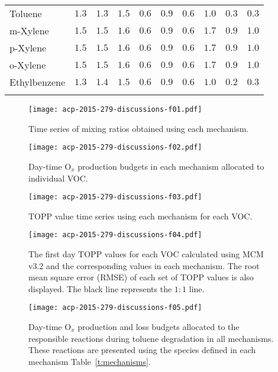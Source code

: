 \documentclass[acpd, online, hvmath]{copernicus}
\begin{document}
\begin{table}
{\begin{tabular}{llllllllll}
      Toluene &$1.3$ &$1.3$ &$1.5$ &$0.6$ &$0.9$ &$0.6$ &$1.0$ &$0.3$ &$0.3$ \\
      m-Xylene &$1.5$ &$1.5$ &$1.6$ &$0.6$ &$0.9$ &$0.6$ &$1.7$ &$0.9$ &$1.0$ \\
      p-Xylene &$1.5$ &$1.5$ &$1.6$ &$0.6$ &$0.9$ &$0.6$ &$1.7$ &$0.9$ &$1.0$ \\
      o-Xylene &$1.5$ &$1.5$ &$1.6$ &$0.6$ &$0.9$ &$0.6$ &$1.7$ &$0.9$ &$1.0$ \\
      Ethylbenzene &$1.3$ &$1.4$ &$1.5$ &$0.6$ &$0.9$ &$0.6$ &$1.0$ &$0.2$ &$0.3$ \\
      \bottomhline
    \end{tabular}}
    \label{t:cumulative_TOPPs_per_C}
\end{table}



\begin{figure}[t]
    \texttt{[image: acp-2015-279-discussions-f01.pdf]}
    \caption{Time series of  mixing ratios obtained using
      each mechanism.}
    \label{f:time_series}
\end{figure}
\begin{figure}
    \texttt{[image: acp-2015-279-discussions-f02.pdf]}
    \caption{Day-time O$_{x}$ production budgets in each mechanism
      allocated to individual VOC.}
    \label{f:Ox_tagged_budgets}
\end{figure}
\begin{figure}[t]
  \texttt{[image: acp-2015-279-discussions-f03.pdf]}
  \caption{TOPP value time series using each mechanism for each VOC.}
  \label{f:TOPP_dailies}
\end{figure}
\begin{figure}[t]
  \texttt{[image: acp-2015-279-discussions-f04.pdf]}
  \caption{The first day TOPP values for each VOC calculated using MCM
    v3.2 and the corresponding values in each mechanism. The root mean
    square error (RMSE) of each set of TOPP values is also
    displayed. The black line represents the $1:1$ line.}
    \label{f:first_day}
\end{figure}
\begin{figure}[t]
    \texttt{[image: acp-2015-279-discussions-f05.pdf]}
    \caption{Day-time O$_{x}$ production and loss budgets allocated
      to the responsible reactions during toluene degradation in all
      mechanisms. These reactions are presented using the species
      defined in each mechanism Table~\ref{t:mechanisms}.}
    \label{f:toluene_Ox}
\end{figure}
\end{document}
